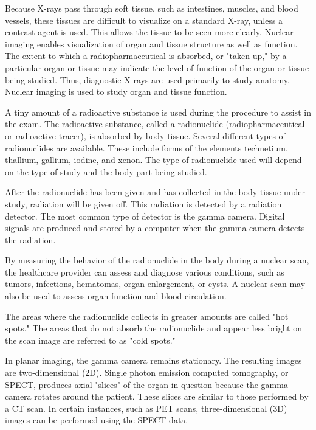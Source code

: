 \documentclass[12pt]{article}
\begin{document}
\noindent Because X-rays pass through soft tissue, such as intestines, muscles, and blood vessels, these tissues are difficult to visualize on a standard X-ray, unless a contrast agent is used. This allows the tissue to be seen more clearly. Nuclear imaging enables visualization of organ and tissue structure as well as function. The extent to which a radiopharmaceutical is absorbed, or "taken up," by a particular organ or tissue may indicate the level of function of the organ or tissue being studied. Thus, diagnostic X-rays are used primarily to study anatomy. Nuclear imaging is used to study organ and tissue function.

\noindent A tiny amount of a radioactive substance is used during the procedure to assist in the exam. The radioactive substance, called a radionuclide (radiopharmaceutical or radioactive tracer), is absorbed by body tissue. Several different types of radionuclides are available. These include forms of the elements technetium, thallium, gallium, iodine, and xenon. The type of radionuclide used will depend on the type of study and the body part being studied.

\noindent After the radionuclide has been given and has collected in the body tissue under study, radiation will be given off. This radiation is detected by a radiation detector. The most common type of detector is the gamma camera. Digital signals are produced and stored by a computer when the gamma camera detects the radiation.

\noindent By measuring the behavior of the radionuclide in the body during a nuclear scan, the healthcare provider can assess and diagnose various conditions, such as tumors, infections, hematomas, organ enlargement, or cysts. A nuclear scan may also be used to assess organ function and blood circulation.

\noindent The areas where the radionuclide collects in greater amounts are called "hot spots." The areas that do not absorb the radionuclide and appear less bright on the scan image are referred to as "cold spots."

\noindent In planar imaging, the gamma camera remains stationary. The resulting images are two-dimensional (2D). Single photon emission computed tomography, or SPECT, produces axial "slices" of the organ in question because the gamma camera rotates around the patient. These slices are similar to those performed by a CT scan. In certain instances, such as PET scans, three-dimensional (3D) images can be performed using the SPECT data.





\end{document}
